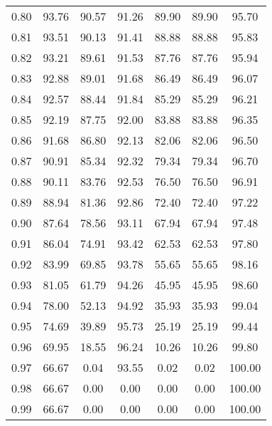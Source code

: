 \begin{tabular}{|c|c|c|c|c|c|c|}
      0.80 &     93.76 &     90.57 &      91.26 &   89.90 &      89.90 &         95.70 \\
      0.81 &     93.51 &     90.13 &      91.41 &   88.88 &      88.88 &         95.83 \\
      0.82 &     93.21 &     89.61 &      91.53 &   87.76 &      87.76 &         95.94 \\
      0.83 &     92.88 &     89.01 &      91.68 &   86.49 &      86.49 &         96.07 \\
      0.84 &     92.57 &     88.44 &      91.84 &   85.29 &      85.29 &         96.21 \\
      0.85 &     92.19 &     87.75 &      92.00 &   83.88 &      83.88 &         96.35 \\
      0.86 &     91.68 &     86.80 &      92.13 &   82.06 &      82.06 &         96.50 \\
      0.87 &     90.91 &     85.34 &      92.32 &   79.34 &      79.34 &         96.70 \\
      0.88 &     90.11 &     83.76 &      92.53 &   76.50 &      76.50 &         96.91 \\
      0.89 &     88.94 &     81.36 &      92.86 &   72.40 &      72.40 &         97.22 \\
      0.90 &     87.64 &     78.56 &      93.11 &   67.94 &      67.94 &         97.48 \\
      0.91 &     86.04 &     74.91 &      93.42 &   62.53 &      62.53 &         97.80 \\
      0.92 &     83.99 &     69.85 &      93.78 &   55.65 &      55.65 &         98.16 \\
      0.93 &     81.05 &     61.79 &      94.26 &   45.95 &      45.95 &         98.60 \\
      0.94 &     78.00 &     52.13 &      94.92 &   35.93 &      35.93 &         99.04 \\
      0.95 &     74.69 &     39.89 &      95.73 &   25.19 &      25.19 &         99.44 \\
      0.96 &     69.95 &     18.55 &      96.24 &   10.26 &      10.26 &         99.80 \\
      0.97 &     66.67 &      0.04 &      93.55 &    0.02 &       0.02 &        100.00 \\
      0.98 &     66.67 &      0.00 &       0.00 &    0.00 &       0.00 &        100.00 \\
      0.99 &     66.67 &      0.00 &       0.00 &    0.00 &       0.00 &        100.00 \\
\bottomrule
\end{tabular}
